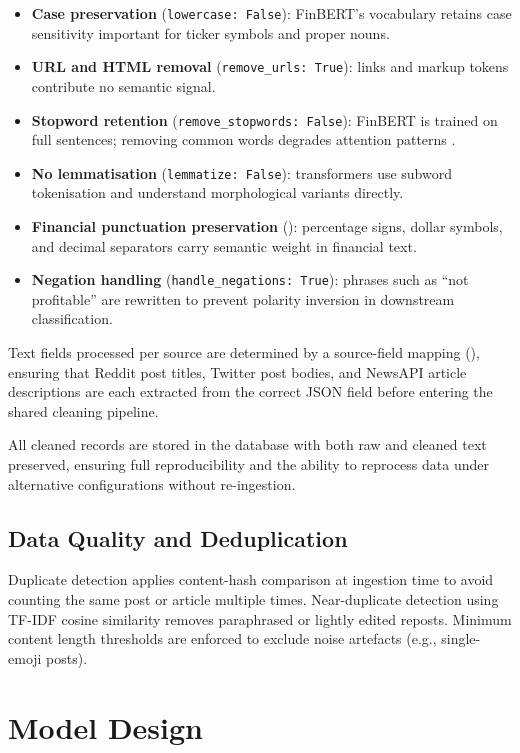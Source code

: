 \begin{itemize}
    \item \textbf{Case preservation} (\texttt{lowercase: False}): FinBERT's vocabulary retains case sensitivity important for ticker symbols and proper nouns.
    \item \textbf{URL and HTML removal} (\texttt{remove\_urls: True}): links and markup tokens contribute no semantic signal.
    \item \textbf{Stopword retention} (\texttt{remove\_stopwords: False}): FinBERT is trained on full sentences; removing common words degrades attention patterns \citep{araci2019finbert}.
    \item \textbf{No lemmatisation} (\texttt{lemmatize: False}): transformers use subword tokenisation and understand morphological variants directly.
    \item \textbf{Financial punctuation preservation} (): percentage signs, dollar symbols, and decimal separators carry semantic weight in financial text.
    \item \textbf{Negation handling} (\texttt{handle\_negations: True}): phrases such as ``not profitable'' are rewritten to prevent polarity inversion in downstream classification.
\end{itemize}

Text fields processed per source are determined by a source-field mapping (), ensuring that Reddit post titles, Twitter post bodies, and NewsAPI article descriptions are each extracted from the correct JSON field before entering the shared cleaning pipeline.

All cleaned records are stored in the database with both raw and cleaned text preserved, ensuring full reproducibility and the ability to reprocess data under alternative configurations without re-ingestion.

\subsection{Data Quality and Deduplication}

Duplicate detection applies content-hash comparison at ingestion time to avoid counting the same post or article multiple times.  Near-duplicate detection using TF-IDF cosine similarity removes paraphrased or lightly edited reposts.  Minimum content length thresholds are enforced to exclude noise artefacts (e.g., single-emoji posts).

\section{Model Design}
\label{sec:model_design}

